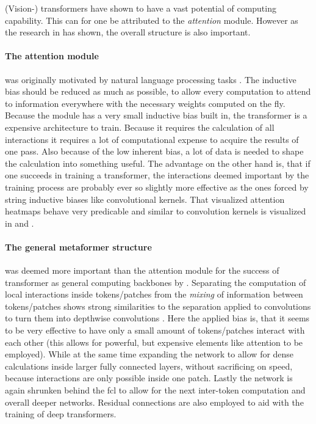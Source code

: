 (Vision-) transformers have shown to have a vast potential of computing capability. 
This can for one be attributed to the \emph{attention} module. 
However as the research in \cite{metaformerPaper} has shown, the overall structure is also important.

\paragraph{The attention module} was originally motivated by natural language processing tasks \cite{attentionIsAllYouNeed}. The inductive bias should be reduced as much as possible, to allow every computation to attend to information everywhere with the necessary weights computed on the fly.
Because the module has a very small inductive bias built in, the transformer is a expensive architecture to train. 
Because it requires the calculation of all interactions it requires a lot of computational expense to acquire the results of one pass.
Also because of the low inherent bias, a lot of data is needed to shape the calculation into something useful.
The advantage on the other hand is, that if one succeeds in training a transformer, the interactions deemed important by the training process are probably ever so slightly more effective as the ones forced by string inductive biases like convolutional kernels. That visualized attention heatmaps behave very predicable and similar to convolution kernels is visualized in \cite{dinoPaper} and \cite{imageWorth16x16}.

\paragraph{The general metaformer structure} was deemed more important than the attention module for the success of transformer as general computing backbones by \cite{metaformerPaper}.
Separating the computation of local interactions inside tokens/patches from the \emph{mixing} of information between tokens/patches shows strong similarities to the separation applied to convolutions to turn them into depthwise convolutions \cite{mobileNetPaper}.
Here the applied bias is, that it seems to be very effective to have only a small amount of tokens/patches interact with each other (this allows for powerful, but expensive elements like attention to be employed).
While at the same time expanding the network to allow for dense calculations inside larger fully connected layers, without sacrificing on speed, because interactions are only possible inside one patch.
Lastly the network is again shrunken behind the fcl to allow for the next inter-token computation and overall deeper networks.
Residual connections are also employed to aid with the training of deep transformers.

